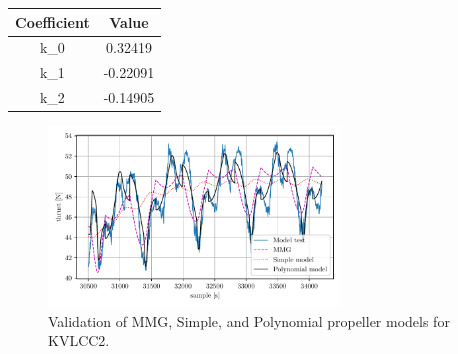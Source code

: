 \vspace{0.2cm}
\begin{minipage}[c]{0.49\textwidth}
    \vspace{-0.40cm}
    \centering
    \label{tab:kt_coefficients}
    \begin{tabular}{c c}
        \toprule
        Coefficient & Value \\
        \hline
        k_0 & 0.32419 \\
        k_1 & -0.22091 \\
        k_2 & -0.14905 \\
        \bottomrule
    \end{tabular}
\end{minipage}
\hfill
\begin{minipage}[c]{0.49\textwidth}
\label{\detokenize{06.20_results_kvlcc2:kvlcc2-propeller-model}}

\end{minipage}
\vspace{-0.5cm}
\begin{figure}[!htb]
\centering
\includegraphics[width=0.69\textwidth]{kappa/images/13.pdf}
\caption{Validation of MMG, Simple, and Polynomial propeller models for KVLCC2.}\label{\detokenize{06.20_results_kvlcc2:fig-propeller-validation}}\end{figure}
\clearpage

